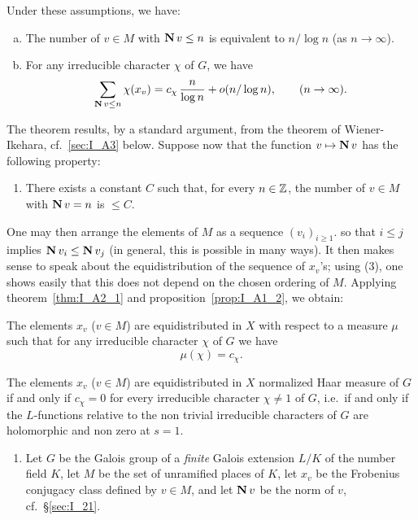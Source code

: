 \begin{subappendices}
Under these assumptions, we have:
\begin{thm}\label{thm:I_A2_1}
\begin{enumerate}[(a)]
\item The number of $v \in M$ with $\operatorname{\mathbf{N}} v \le n$ is equivalent to $n/\log
	n$ (as $n \to \infty$).
\item For any irreducible character $\chi$ of $G$, we have
	$$ \sum_{\operatorname{\mathbf{N}} v\le n} \chi(x_v) = c_\chi \, \frac{n}{\log n} +
	o(n/\log n), \qquad (n \to \infty). $$
\end{enumerate}
\end{thm}
The theorem results, by a standard argument, from the theorem of
Wiener-Ikehara, cf.\ \ref{sec:I_A3} below.
Suppose now that the function $v \mapsto \operatorname{\mathbf{N}} v$ has the following
property:

\begin{enumerate}[resume*=Lfunc_hyp]
\item\dpage
	There exists a constant $C$ such that, for every $n \in \mathbb{Z}$, the number
	of $v \in M$ with $\operatorname{\mathbf{N}} v = n$ is $\le C$.
\end{enumerate}
One may then arrange the elements of $M$ as a sequence
$(v_i)_{i\ge 1}$. so that $i \le j$ implies $\operatorname{\mathbf{N}} v_i \le \operatorname{\mathbf{N}} v_j$ (in
general, this is possible in many ways). It then makes sense to speak about the
equidistribution of the sequence of $x_v$'s; using (3), one shows easily that
this does not depend on the chosen ordering of $M$. Applying
theorem~\ref{thm:I_A2_1} and proposition~\ref{prop:I_A1_2}, we obtain:
\begin{thm}
The elements $x_v$ ($v \in M$) are equidistributed in $X$
with respect to a measure $\mu$ such that for any irreducible character
$\chi$ of $G$ we have
$$ \mu(\chi) = c_\chi. $$
\end{thm}
\begin{cor}
	The elements $x_v$ ($v \in M$) are equidistributed in $X$
	normalized Haar measure of $G$ if and only if $c_\chi = 0$ for every
	irreducible character $\chi \ne 1$ of $G$, i.e.\, if and only if the
	$L$-functions relative to the non trivial irreducible characters of $G$
	are holomorphic and non zero at $s = 1$.
\end{cor}

\begin{ex}
\begin{enumerate}[series=ex_IA3]
\item Let $G$ be the Galois group of a \emph{finite} Galois extension
	$L/K$ of the number field $K$, let $M$ be the set of unramified places
	of $K$, let $x_v$ be the Frobenius conjugacy class defined by $v \in M$,
	and let $\operatorname{\mathbf{N}} v$ be the norm of $v$, cf.\ \S\ref{sec:I_21}.


\end{enumerate}
\end{ex}
\end{subappendices}
